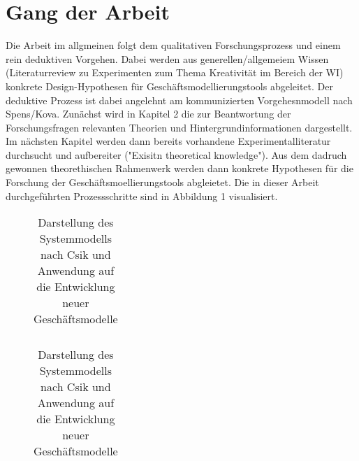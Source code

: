 \section{Gang der Arbeit}
Die Arbeit im allgmeinen folgt dem qualitativen Forschungsprozess und einem rein deduktiven Vorgehen. Dabei werden aus generellen/allgemeiem Wissen (Literaturreview zu Experimenten zum Thema Kreativität im Bereich der WI) konkrete Design-Hypothesen für Geschäftsmodellierungstools abgeleitet. Der deduktive Prozess ist dabei angelehnt am kommunizierten Vorgehesnmodell nach Spens/Kova.
Zunächst wird in Kapitel 2 die zur Beantwortung der Forschungsfragen relevanten Theorien und Hintergrundinformationen dargestellt. Im nächsten Kapitel werden dann bereits vorhandene Experimentalliteratur durchsucht und aufbereiter ("Exisitn theoretical knowledge"). Aus dem dadruch gewonnen theorethischen Rahmenwerk werden dann konkrete Hypothesen für die Forschung der Geschäftsmoellierungstools abgleietet. Die in dieser Arbeit durchgeführten Prozessschritte sind in Abbildung 1 visualisiert. 

\noindent
\begin{table}[H]
\centering
\begin{subfigure}[t]{0.45\linewidth}
\begin{tabular}{@{}c@{}}

\end{tabular}
\end{subfigure}
\hfill
\begin{subfigure}[t]{0.45\linewidth}
\begin{tabular}{@{}c@{}}

\end{tabular}
\end{subfigure}
\caption{ Darstellung des Systemmodells nach Csik und Anwendung auf die Entwicklung neuer Geschäftsmodelle}
\end{table}
